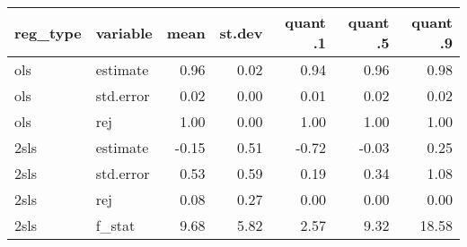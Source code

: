 \begin{tabular}{llrrrrr}
  \hline
reg\_type & variable & mean & st.dev & quant .1 & quant .5 & quant .9 \\ 
  \hline
ols & estimate & 0.96 & 0.02 & 0.94 & 0.96 & 0.98 \\ 
  ols & std.error & 0.02 & 0.00 & 0.01 & 0.02 & 0.02 \\ 
  ols & rej & 1.00 & 0.00 & 1.00 & 1.00 & 1.00 \\ 
  2sls & estimate & -0.15 & 0.51 & -0.72 & -0.03 & 0.25 \\ 
  2sls & std.error & 0.53 & 0.59 & 0.19 & 0.34 & 1.08 \\ 
  2sls & rej & 0.08 & 0.27 & 0.00 & 0.00 & 0.00 \\ 
  2sls & f\_stat & 9.68 & 5.82 & 2.57 & 9.32 & 18.58 \\ 
   \hline
\end{tabular}
